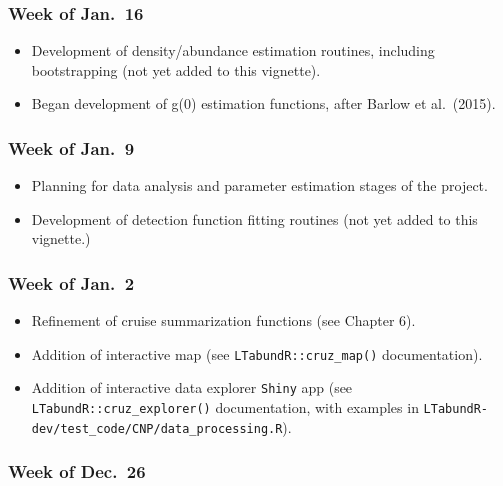 \documentclass[
]{book}
\begin{document}
\hypertarget{week-of-jan.-16}{%
\subsubsection*{Week of Jan.~16}\label{week-of-jan.-16}}

\begin{itemize}
\item
  Development of density/abundance estimation routines, including bootstrapping (not yet added to this vignette).
\item
  Began development of g(0) estimation functions, after Barlow et al.~(2015).
\end{itemize}

\hypertarget{week-of-jan.-9}{%
\subsubsection*{Week of Jan.~9}\label{week-of-jan.-9}}

\begin{itemize}
\item
  Planning for data analysis and parameter estimation stages of the project.
\item
  Development of detection function fitting routines (not yet added to this vignette.)
\end{itemize}

\hypertarget{week-of-jan.-2}{%
\subsubsection*{Week of Jan.~2}\label{week-of-jan.-2}}

\begin{itemize}
\item
  Refinement of cruise summarization functions (see Chapter 6).
\item
  Addition of interactive map (see \texttt{LTabundR::cruz\_map()} documentation).
\item
  Addition of interactive data explorer \texttt{Shiny} app (see \texttt{LTabundR::cruz\_explorer()} documentation, with examples in \texttt{LTabundR-dev/test\_code/CNP/data\_processing.R}).
\end{itemize}

\hypertarget{week-of-dec.-26}{%
\subsubsection*{Week of Dec.~26}\label{week-of-dec.-26}}
\end{document}
